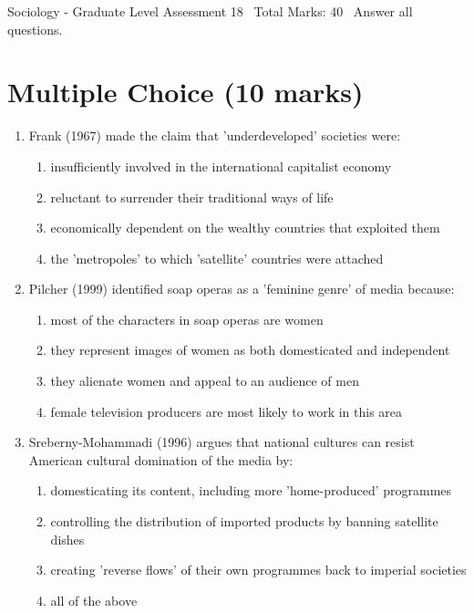 \documentclass[12pt]{article}
\begin{document}
\begin{center}
Sociology - Graduate Level Assessment 18 \
Total Marks: 40 \
Answer all questions.
\end{center}

\section*{Multiple Choice (10 marks)}
\begin{enumerate}[label=\arabic*.]
\item Frank (1967) made the claim that 'underdeveloped' societies were:
\begin{enumerate}[label=(\alph*)]
    \item insufficiently involved in the international capitalist economy
    \item reluctant to surrender their traditional ways of life
    \item economically dependent on the wealthy countries that exploited them
    \item the 'metropoles' to which 'satellite' countries were attached
\end{enumerate}
\item Pilcher (1999) identified soap operas as a 'feminine genre' of media because:
\begin{enumerate}[label=(\alph*)]
    \item most of the characters in soap operas are women
    \item they represent images of women as both domesticated and independent
    \item they alienate women and appeal to an audience of men
    \item female television producers are most likely to work in this area
\end{enumerate}
\item Sreberny-Mohammadi (1996) argues that national cultures can resist American cultural domination of the media by:
\begin{enumerate}[label=(\alph*)]
    \item domesticating its content, including more 'home-produced' programmes
    \item controlling the distribution of imported products by banning satellite dishes
    \item creating 'reverse flows' of their own programmes back to imperial societies
    \item all of the above
\end{enumerate}

\end{enumerate}
\end{document}
